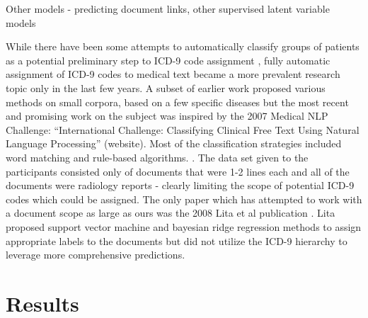 \documentclass{article}
\begin{document}
Other models - predicting document links, other supervised latent
variable models

While there have been some attempts to automatically classify groups
of patients as a potential preliminary step to ICD-9 code assignment
\citep{Ruch2008,FreitasJunior2006,RibeiroNeto2001,Brown2006}, fully
automatic assignment of ICD-9 codes to medical text became a more
prevalent research topic only in the last few years. A subset of earlier
work proposed various methods on small corpora, based on a few specific
diseases \citep{Rao2003} but the most recent and promising work on
the subject was inspired by the 2007 Medical NLP Challenge: \textquotedblleft{}International
Challenge: Classifying Clinical Free Text Using Natural Language Processing\textquotedblright{}
(website). Most of the classification strategies included word matching
and rule-based algorithms. \citep{Goldstein2007,Crammer2007,Farkas2008}.
The data set given to the participants consisted only of documents
that were 1-2 lines each and all of the documents were radiology reports
- clearly limiting the scope of potential ICD-9 codes which could
be assigned. The only paper which has attempted to work with a document
scope as large as ours was the 2008 Lita et al publication \citep{Lita2008}.
Lita proposed support vector machine and bayesian ridge regression
methods to assign appropriate labels to the documents but did not
utilize the ICD-9 hierarchy to leverage more comprehensive predictions.

\section{Results}





\end{document}
